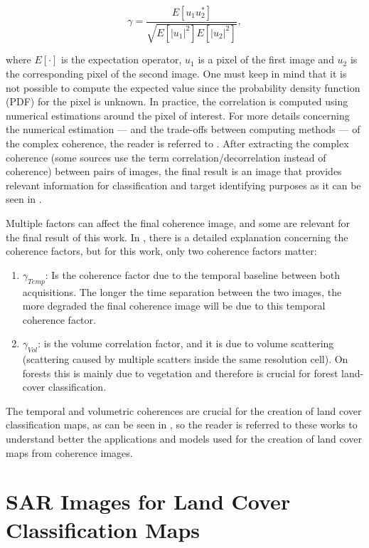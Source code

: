 \begin{equation}
    \gamma = \frac{E[u_1u_2^*]}{\sqrt{E[|u_1|^2]E[|u_2|^2]}},
\end{equation}{}

\noindent
where $E[\cdot]$ is the expectation operator, $u_1$ is a pixel of the first image and $u_2$ is the corresponding pixel of the second image. One must keep in mind that it is not possible to compute the expected value since the probability density function (PDF) for the pixel is unknown. In practice, the correlation is computed using numerical estimations around the pixel of interest. For more details concerning the numerical estimation --- and the trade-offs between computing methods --- of the complex coherence, the reader is referred to \cite{Bamler}. After extracting the complex coherence (some sources use the term correlation/decorrelation instead of coherence) between pairs of images, the final result is an image that provides relevant information for classification and target identifying purposes as it can be seen in \cite{Alberto,Paolathesis,Martone, Martone2, Martone3, first_interferometric, Krieger,Paolo, Acqua}.

Multiple factors can affect the final coherence image, and some are relevant for the final result of this work. In \cite{Krieger,Paolathesis}, there is a detailed explanation concerning the coherence factors, but for this work, only two coherence factors matter:
\begin{enumerate}
    \item $\gamma_{Temp}$: Is the coherence factor due to the temporal baseline between both acquisitions. The longer the time separation between the two images, the more degraded the final coherence image will be due to this temporal coherence factor.
    \item
    $\gamma_{Vol}$: is the volume correlation factor, and it is due to volume scattering (scattering caused by multiple scatters inside the same resolution cell). On forests this is mainly due to vegetation and therefore is crucial for forest land-cover classification.
\end{enumerate} 

The temporal and volumetric coherences are crucial for the creation of land cover classification maps, as can be seen in \cite{Paolo, Rodrigo}, so the reader is referred to these works to understand better the applications and models used for the creation of land cover maps from coherence images.

\section{SAR Images for Land Cover Classification Maps}

